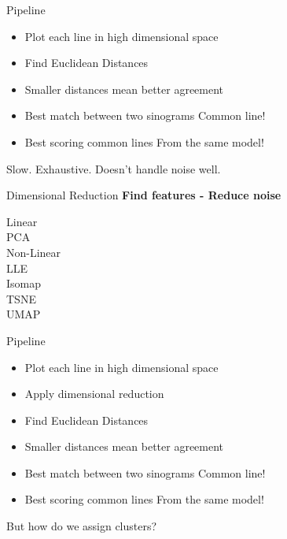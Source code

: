 \documentclass[t, 11pt, xcolor=dvipsnames]{beamer}
\begin{document}
\begin{frame}[fragile]{Pipeline}
    \begin{itemize}
    \item Plot each line in high dimensional space %
    \item Find Euclidean Distances 
    \item Smaller distances mean better agreement
    \item Best match between two sinograms \textrightarrow{} Common line!
    \item Best scoring common lines \textrightarrow{} From the same model!
    \end{itemize}

    \pause
    Slow.
    \pause
    Exhaustive.
    \pause
    Doesn't handle noise well.
\end{frame}

\begin{frame}[fragile]{Dimensional Reduction}
  \centering\textbf{Find features - Reduce noise}


  Linear \\
  PCA\\

  Non-Linear \\
  LLE\\
  Isomap \\
  TSNE\\
  UMAP\\

\end{frame}

\begin{frame}[fragile]{Pipeline}
    \begin{itemize}
    \item Plot each line in high dimensional space %
    \item Apply dimensional reduction %
    \item Find Euclidean Distances 
    \item Smaller distances mean better agreement
    \item Best match between two sinograms \textrightarrow{} Common line!
    \item Best scoring common lines \textrightarrow{} From the same model!
    \end{itemize}

    \pause
    But how do we assign clusters?
\end{frame}
\end{document}
